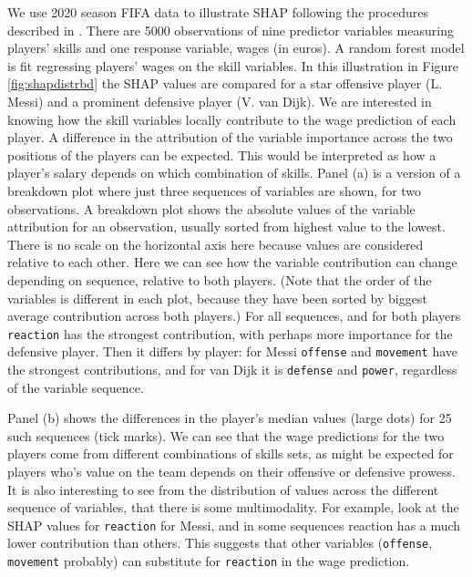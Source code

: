 \documentclass[
]{jss}
\begin{document}
We use 2020 season FIFA data \citep{leone_fifa_2020} to illustrate SHAP following the procedures described in \citet{biecek_explanatory_2021}. There are 5000 observations of nine predictor variables measuring players' skills and one response variable, wages (in euros). A random forest model is fit regressing players' wages on the skill variables. In this illustration in Figure \ref{fig:shapdistrbd} the SHAP values are compared for a star offensive player (L. Messi) and a prominent defensive player (V. van Dijk). We are interested in knowing how the skill variables locally contribute to the wage prediction of each player. A difference in the attribution of the variable importance across the two positions of the players can be expected. This would be interpreted as how a player's salary depends on which combination of skills. Panel (a) is a version of a breakdown plot \citep{gosiewska_ibreakdown_2019} where just three sequences of variables are shown, for two observations. A breakdown plot shows the absolute values of the variable attribution for an observation, usually sorted from highest value to the lowest. There is no scale on the horizontal axis here because values are considered relative to each other. Here we can see how the variable contribution can change depending on sequence, relative to both players. (Note that the order of the variables is different in each plot, because they have been sorted by biggest average contribution across both players.) For all sequences, and for both players \texttt{reaction} has the strongest contribution, with perhaps more importance for the defensive player. Then it differs by player: for Messi \texttt{offense} and \texttt{movement} have the strongest contributions, and for van Dijk it is \texttt{defense} and \texttt{power}, regardless of the variable sequence.

Panel (b) shows the differences in the player's median values (large dots) for 25 such sequences (tick marks). We can see that the wage predictions for the two players come from different combinations of skills sets, as might be expected for players who's value on the team depends on their offensive or defensive prowess. It is also interesting to see from the distribution of values across the different sequence of variables, that there is some multimodality. For example, look at the SHAP values for \texttt{reaction} for Messi, and in some sequences reaction has a much lower contribution than others. This suggests that other variables (\texttt{offense}, \texttt{movement} probably) can substitute for \texttt{reaction} in the wage prediction.
\end{document}
